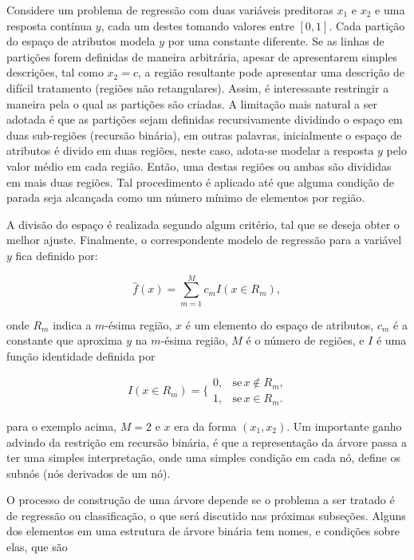 Considere um problema de regressão com duas variáveis preditoras $x_1$ e $x_2$ e uma resposta contínua $y$, cada um destes tomando valores entre $[0,1]$. Cada partição do espaço de atributos modela $y$ por uma constante diferente. Se as linhas de partições forem definidas de maneira arbitrária, apesar de apresentarem simples descrições, tal como $x_2=c$, a região resultante pode apresentar uma descrição de difícil tratamento (regiões não retangulares). Assim, é interessante restringir a maneira pela o qual as partições são criadas. A limitação mais natural a ser adotada é que as partições sejam definidas recursivamente dividindo o espaço em duas sub-regiões (recursão binária), em outras palavras, inicialmente o espaço de atributos é divido em duas regiões, neste caso, adota-se modelar a resposta $y$ pelo valor médio em cada região. Então, uma destas regiões ou ambas são divididas em mais duas regiões. Tal procedimento é aplicado até que alguma condição de parada seja alcançada como um número mínimo de elementos por região.

A divisão do espaço é realizada segundo algum critério, tal que se deseja obter o melhor ajuste. Finalmente, o correspondente modelo de regressão para a variável $y$ fica definido por:

\begin{equation}\label{eq:treeresponse}
\hat{f}(x)=\sum_{m=1}^Mc_mI(x\in{R_m})\mbox{,}~
\end{equation}

onde $R_m$ indica a $m$-ésima região, $x$ é um elemento do espaço de atributos, $c_m$ é a constante que aproxima $y$ na $m$-ésima região, $M$ é o número de regiões, e $I$ é uma função identidade definida por

\begin{equation}
I(x\in{R_m})=\Big\{\begin{array}{cc}
0,&\mbox{se}\, x\notin{R_m}\mbox{,}\\
1,&\mbox{se}\, x\in{R_m}\mbox{.}
\end{array}
\end{equation}

\noindent
para o exemplo acima, $M=2$ e $x$ era da forma $(x_1, x_2)$. Um importante ganho advindo da restrição em recursão binária, é que a representação da árvore passa a ter uma simples interpretação, onde uma simples condição em cada nó, define os subnós (nós derivados de um nó).

O processo de construção de uma árvore depende se o problema a ser tratado é de regressão ou classificação, o que será discutido nas próximas subseções. Alguns dos elementos em uma estrutura de árvore binária tem nomes, e condições sobre elas, que são

